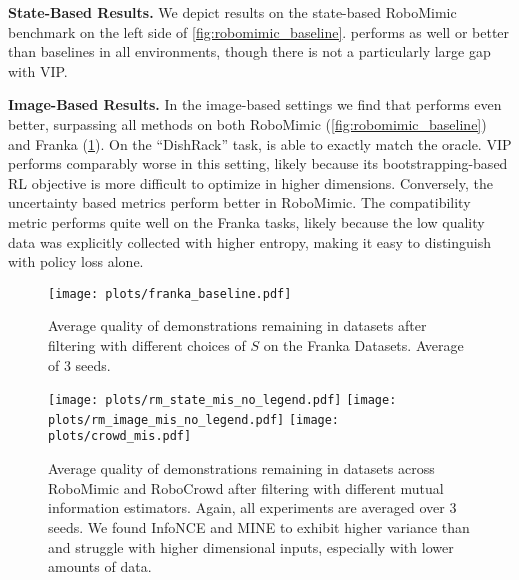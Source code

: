 \noindent \textbf{State-Based Results.}
We depict results on the state-based RoboMimic benchmark on the left side of \cref{fig:robomimic_baseline}. \abv performs as well or better than baselines in all environments, though there is not a particularly large gap with VIP. 

\noindent \textbf{Image-Based Results.}
In the image-based settings we find that \abv performs even better, surpassing all methods on both RoboMimic (\cref{fig:robomimic_baseline}) and Franka (\cref{fig:franka_baseline}). On the ``DishRack'' task, \abv is able to exactly match the oracle. VIP performs comparably worse in this setting, likely because its bootstrapping-based RL objective is more difficult to optimize in higher dimensions. Conversely, the uncertainty based metrics perform better in RoboMimic. The  compatibility metric performs quite well on the Franka tasks, likely because the low quality data was explicitly collected with higher entropy, making it easy to distinguish with policy loss alone.



\begin{figure}
    \centering
    \texttt{[image: plots/franka\_baseline.pdf]}
    \vspace{-0.1in}
    \caption{Average quality of demonstrations remaining in datasets after filtering with different choices of $S$ on the Franka Datasets. Average of 3 seeds.}
    \label{fig:franka_baseline}
\end{figure}

\begin{figure*}[t]
    \centering
    \texttt{[image: plots/rm\_state\_mis\_no\_legend.pdf]}
    \texttt{[image: plots/rm\_image\_mis\_no\_legend.pdf]}
    \texttt{[image: plots/crowd\_mis.pdf]}
    \vspace{-0.2in}
    \caption{Average quality of demonstrations remaining in datasets across RoboMimic and RoboCrowd after filtering with different mutual information estimators. Again, all experiments are averaged over 3 seeds. We found InfoNCE and MINE to exhibit higher variance than \abv and struggle with higher dimensional inputs, especially with lower amounts of data.}
    \label{fig:mi_estimators}
\end{figure*}

